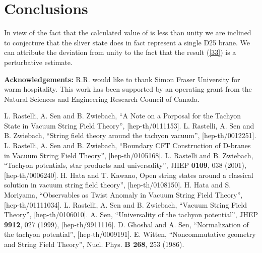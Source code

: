 \documentclass[a4paper,12pt]{article}
\begin{document}
\vspace*{.8cm}

\section{Conclusions}

In view of the fact that the calculated value of
\coordHE{}
is less than unity we are inclined to conjecture that the sliver state
does in fact represent a single D25 brane. We can attribute the deviation
from unity to the fact that the result (\ref{33})
is a perturbative estimate.

\vspace*{.8cm}

{\bf Acknowledgements:}  R.R. would like to thank Simon Fraser
University for warm hospitality. This work has been supported by an
operating grant from the Natural Sciences and Engineering Research Council
of Canada.

\vspace*{.8cm}


\begin{thebibliography}{99}
 L. Rastelli, A. Sen and B. Zwiebach, ``A Note on a Porposal
for the Tachyon State in Vacuum String Field Theory'', [hep-th/0111153].
 L. Rastelli, A. Sen and B. Zwiebach, ``String field theory
around the tachyon vacuum'', [hep-th/0012251].
 L. Rastelli, A. Sen and B. Zwiebach, ``Boundary CFT
Construction of D-branes in Vacuum String Field Theory'', [hep-th/0105168].
 L. Rastelli and B. Zwiebach, ``Tachyon potentials, star
products and universality'', JHEP {\bf 0109}, 038 (2001),
[hep-th/0006240].
 H. Hata and T. Kawano, Open string states around a classical
solution in vacuum string field theory'', [hep-th/0108150].
 H. Hata and S. Moriyama, ``Observables as Twist Anomaly
in Vacuum String Field Theory'', [hep-th/01111034].
 L. Rastelli, A. Sen and B. Zwiebach,
``Vacuum String Field Theory'', [hep-th/0106010].
 A. Sen, ``Universality of the tachyon potential'',
JHEP {\bf 9912}, 027 (1999), [hep-th/9911116].
 D. Ghoshal and A. Sen, ``Normalization of the tachyon
potential'', [hep-th/0009191].
 E. Witten, ``Noncommutative geometry and String Field Theory'',
Nucl. Phys. {\bf B 268}, 253 (1986).
\end{thebibliography}
\end{document}
